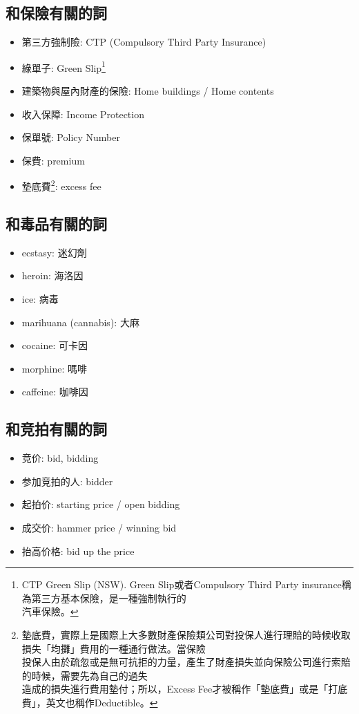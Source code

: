 \subsection{和保險有關的詞}
\begin{multicols}{2}
\begin{itemize}
  \itemsep0em
  \item 第三方強制險: CTP (Compulsory Third Party Insurance)
  \item 綠單子: Green Slip\footnote{CTP Green Slip (NSW). Green Slip或者Compulsory Third Party insurance稱為第三方基本保險，是一種強制執行的\\汽車保險。}
  \item 建築物與屋內財產的保險: Home buildings / Home contents
  \item 收入保障: Income Protection
  \item 保單號: Policy Number
  \item 保費: premium
  \item 墊底費\footnote{墊底費，實際上是國際上大多數財產保險類公司對投保人進行理賠的時候收取損失「均攤」費用的一種通行做法。當保險\\投保人由於疏忽或是無可抗拒的力量，產生了財產損失並向保險公司進行索賠的時候，需要先為自己的過失 \\ 造成的損失進行費用墊付；所以，Excess Fee才被稱作「墊底費」或是「打底費」，英文也稱作Deductible。}: excess fee
\end{itemize}
\end{multicols}

\subsection{和毒品有關的詞}
\begin{multicols}{2}
\begin{itemize}
  \itemsep0em
  \item ecstasy: 迷幻劑
  \item heroin: 海洛因
  \item ice: 病毒
  \item marihuana (cannabis): 大麻
  \item cocaine: 可卡因
  \item morphine: 嗎啡
  \item caffeine: 咖啡因
\end{itemize}
\end{multicols}

\subsection{和竞拍有關的詞}
\begin{multicols}{2}
\begin{itemize}
  \itemsep0em
  \item 竞价: bid, bidding
  \item 参加竞拍的人: bidder
  \item 起拍价: starting price / open bidding
  \item 成交价: hammer price / winning bid
  \item 抬高价格: bid up the price
\end{itemize}
\end{multicols}

